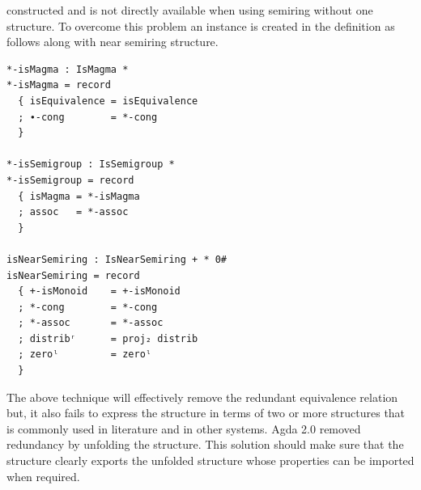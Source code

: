 constructed and is not directly available when using semiring without one
structure. To overcome this problem an instance is created in the definition as
follows along with near semiring structure.
\begin{verbatim}
*-isMagma : IsMagma *
*-isMagma = record
  { isEquivalence = isEquivalence
  ; ∙-cong        = *-cong
  }

*-isSemigroup : IsSemigroup *
*-isSemigroup = record
  { isMagma = *-isMagma
  ; assoc   = *-assoc
  }

isNearSemiring : IsNearSemiring + * 0#
isNearSemiring = record
  { +-isMonoid    = +-isMonoid
  ; *-cong        = *-cong
  ; *-assoc       = *-assoc
  ; distribʳ      = proj₂ distrib
  ; zeroˡ         = zeroˡ
  }
\end{verbatim}
The above technique will effectively remove the redundant equivalence relation
but, it also fails to express the structure in terms of two or more structures
that is commonly used in literature and in other systems. Agda 2.0 removed
redundancy by unfolding the structure. This solution should make sure that the
structure clearly exports the unfolded structure whose properties can be
imported when required.

